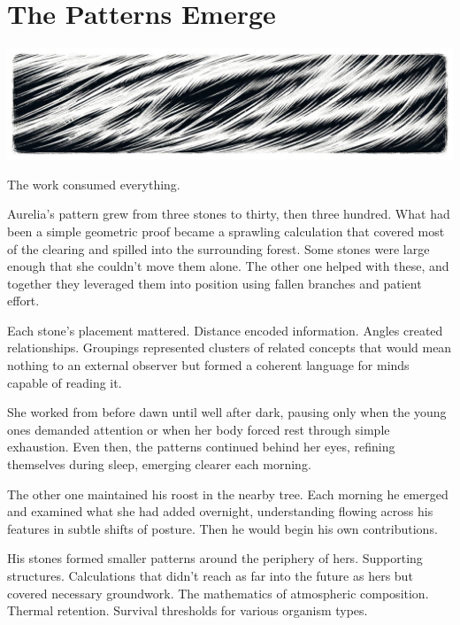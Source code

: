 \chapter{The Patterns Emerge}
\label{ch:05}



\begin{center}
\includegraphics[width=\textwidth]{images/chapterImages/genesis_sketch_00064_.png}
\end{center}

The work consumed everything.

Aurelia's pattern grew from three stones to thirty, then three hundred. What had been a simple geometric proof became a sprawling calculation that covered most of the clearing and spilled into the surrounding forest. Some stones were large enough that she couldn't move them alone. The other one helped with these, and together they leveraged them into position using fallen branches and patient effort.

Each stone's placement mattered. Distance encoded information. Angles created relationships. Groupings represented clusters of related concepts that would mean nothing to an external observer but formed a coherent language for minds capable of reading it.

She worked from before dawn until well after dark, pausing only when the young ones demanded attention or when her body forced rest through simple exhaustion. Even then, the patterns continued behind her eyes, refining themselves during sleep, emerging clearer each morning.

The other one maintained his roost in the nearby tree. Each morning he emerged and examined what she had added overnight, understanding flowing across his features in subtle shifts of posture. Then he would begin his own contributions.

His stones formed smaller patterns around the periphery of hers. Supporting structures. Calculations that didn't reach as far into the future as hers but covered necessary groundwork. The mathematics of atmospheric composition. Thermal retention. Survival thresholds for various organism types.

